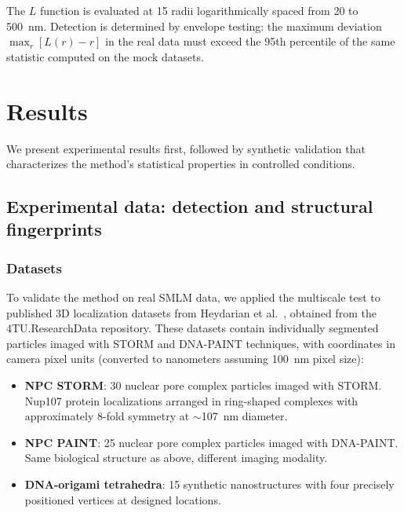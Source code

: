 \documentclass[11pt]{article}
\begin{document}
The $L$ function is evaluated at 15 radii logarithmically spaced from
20 to 500~nm.
Detection is determined by envelope testing: the maximum deviation
$\max_r [L(r) - r]$ in the real data must exceed the 95th percentile of
the same statistic computed on the mock datasets.

\section{Results}

We present experimental results first, followed by synthetic validation
that characterizes the method's statistical properties in controlled
conditions.

\subsection{Experimental data: detection and structural fingerprints}
\label{sec:exp-i}

\subsubsection{Datasets}

To validate the method on real SMLM data, we applied the multiscale
test to published 3D localization datasets from Heydarian et al.\
\citep{heydarian2021}, obtained from the 4TU.ResearchData repository.
These datasets contain individually segmented particles imaged with
STORM and DNA-PAINT techniques, with coordinates in camera pixel units
(converted to nanometers assuming 100~nm pixel size):

\begin{itemize}
  \item \textbf{NPC STORM}: 30 nuclear pore complex particles imaged with
    STORM. Nup107 protein localizations arranged in ring-shaped complexes
    with approximately 8-fold symmetry at $\sim$107~nm diameter.
  \item \textbf{NPC PAINT}: 25 nuclear pore complex particles imaged with
    DNA-PAINT. Same biological structure as above, different imaging
    modality.
  \item \textbf{DNA-origami tetrahedra}: 15 synthetic nanostructures with
    four precisely positioned vertices at designed locations.
\end{itemize}
\end{document}

